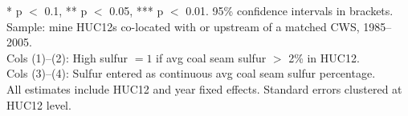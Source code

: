 \begin{table}
\centering
\caption{Effect of ARP Phase I on HUC12 coal production, 1985--2005}
\par\vspace{0.4em}
\begin{minipage}{\linewidth}
\footnotesize
* p $<$ 0.1, ** p $<$ 0.05, *** p $<$ 0.01. 95\% confidence intervals in brackets. \\
Sample: mine HUC12s co-located with or upstream of a matched CWS, 1985--2005. \\
Cols (1)--(2): High sulfur $= 1$ if avg coal seam sulfur $>$ 2\% in HUC12. \\
Cols (3)--(4): Sulfur entered as continuous avg coal seam sulfur percentage. \\
All estimates include HUC12 and year fixed effects. Standard errors clustered at HUC12 level.
\end{minipage}
\end{table}
